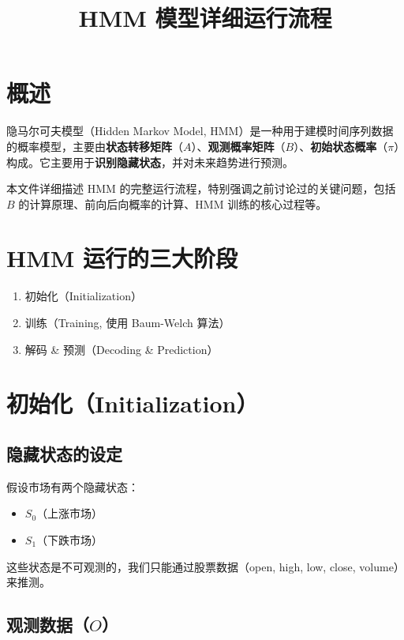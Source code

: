 \documentclass{article}
\begin{document}
\title{HMM 模型详细运行流程}
\author{}
\date{}
\maketitle

\section{概述}

隐马尔可夫模型（Hidden Markov Model, HMM）是一种用于建模时间序列数据的概率模型，主要由\textbf{状态转移矩阵}（$A$）、\textbf{观测概率矩阵}（$B$）、\textbf{初始状态概率}（$\pi$）构成。它主要用于\textbf{识别隐藏状态}，并对未来趋势进行预测。

本文件详细描述 HMM 的完整运行流程，特别强调之前讨论过的关键问题，包括 $B$ 的计算原理、前向后向概率的计算、HMM 训练的核心过程等。

\section{HMM 运行的三大阶段}

\begin{enumerate}
    \item 初始化（Initialization）
    \item 训练（Training, 使用 Baum-Welch 算法）
    \item 解码 \& 预测（Decoding \& Prediction）
\end{enumerate}

\section{初始化（Initialization）}

\subsection{隐藏状态的设定}

假设市场有两个隐藏状态：
\begin{itemize}
    \item $S_0$（上涨市场）
    \item $S_1$（下跌市场）
\end{itemize}

这些状态是不可观测的，我们只能通过股票数据（open, high, low, close, volume）来推测。

\subsection{观测数据（$O$）}
\end{document}
